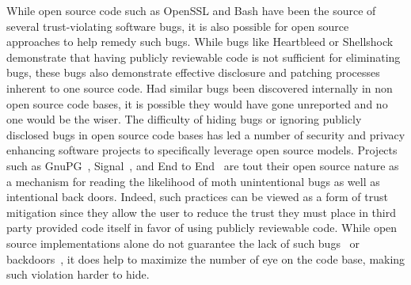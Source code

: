 While open source code such as OpenSSL and Bash have been the source
of several trust-violating software bugs, it is also possible for open
source approaches to help remedy such bugs. While bugs like Heartbleed
or Shellshock demonstrate that having publicly reviewable code is not
sufficient for eliminating bugs, these bugs also demonstrate effective
disclosure and patching processes inherent to one source code. Had
similar bugs been discovered internally in non open source code bases,
it is possible they would have gone unreported and no one would be the
wiser. The difficulty of hiding bugs or ignoring publicly disclosed
bugs in open source code bases has led a number of security and
privacy enhancing software projects to specifically leverage open
source models. Projects such as GnuPG~\cite{gnupg},
Signal~\cite{openwhisper}, and End to End~\cite{google-endtoend,
  yahoo-endtoend} are tout their open source nature as a mechanism for
reading the likelihood of moth unintentional bugs as well as
intentional back doors. Indeed, such practices can be viewed as a form
of trust mitigation since they allow the user to reduce the trust they
must place in third party provided code itself in favor of using
publicly reviewable code. While open source implementations alone do
not guarantee the lack of such bugs~\cite{frosch2014} or
backdoors~\cite{thompson1984}, it does help to maximize the number of
eye on the code base, making such violation harder to hide.




